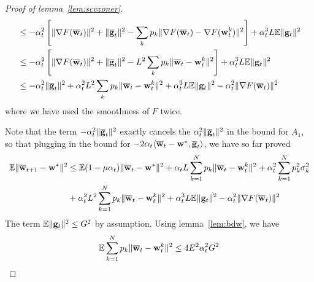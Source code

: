 \begin{proof}[Proof of lemma~\ref{lem:scvxoner}]
\begin{align*}
	& \leq-\alpha_{t}^{2}\left[\|\nabla F({\overline{\mathbf{w}}}_{t})\|^{2}+\|{\overline{\mathbf{g}}}_{t}\|^{2}-\sum_{k}p_{k}\|\nabla F({\overline{\mathbf{w}}}_{t})-\nabla F({\mathbf{w}}_{t}^{k})\|^{2}\right]+\alpha_{t}^{3}L\mathbb{E}\|{\mathbf{g}}_{t}\|^{2}\\
	& \leq-\alpha_{t}^{2}\left[\|\nabla F({\overline{\mathbf{w}}}_{t})\|^{2}+\|{\overline{\mathbf{g}}}_{t}\|^{2}-L^{2}\sum_{k}p_{k}\|{\overline{\mathbf{w}}}_{t}-{\mathbf{w}}_{t}^{k}\|^{2}\right]+\alpha_{t}^{3}L\mathbb{E}\|{\mathbf{g}}_{t}\|^{2}\\
	& \leq-\alpha_{t}^{2}\|{\overline{\mathbf{g}}}_{t}\|^{2}+\alpha_{t}^{2}L^{2}\sum_{k}p_{k}\|{\overline{\mathbf{w}}}_{t}-{\mathbf{w}}_{t}^{k}\|^{2}+\alpha_{t}^{3}L\mathbb{E}\|{\mathbf{g}}_{t}\|^{2}-\alpha_{t}^{2}\|\nabla F({\overline{\mathbf{w}}}_{t})\|^{2}
	\end{align*}
	where we have used the smoothness of $F$ twice. 
	
	Note that the term $-\alpha_{t}^{2}\|{\overline{\mathbf{g}}}_{t}\|^{2}$ exactly
	cancels the $\alpha_{t}^{2}\|{\overline{\mathbf{g}}}_{t}\|^{2}$ in the bound
	for $A_{1}$, so that plugging in the bound for $-2\alpha_{t}\langle{\overline{\mathbf{w}}}_{t}-{\mathbf{w}}^{\ast},{\overline{\mathbf{g}}}_{t}\rangle$,
	we have so far proved 
	\begin{align*}
	\mathbb{E}\|{\overline{\mathbf{w}}}_{t+1}-{\mathbf{w}}^{\ast}\|^{2} & \leq\mathbb{E}(1-\mu\alpha_{t})\|{\overline{\mathbf{w}}}_{t}-{\mathbf{w}}^{\ast}\|^{2}+\alpha_{t}L\sum_{k=1}^{N}p_{k}\|{\overline{\mathbf{w}}}_{t}-{\mathbf{w}}_{t}^{k}\|^{2}+\alpha_{t}^{2}\sum_{k=1}^{N}p_{k}^{2}\sigma_{k}^{2}\\
	& +\alpha_{t}^{2}L^{2}\sum_{k=1}^{N}p_{k}\|{\overline{\mathbf{w}}}_{t}-{\mathbf{w}}_{t}^{k}\|^{2}+\alpha_{t}^{3}L\mathbb{E}\|{\mathbf{g}}_{t}\|^{2}-\alpha_{t}^{2}\|\nabla F({\overline{\mathbf{w}}}_{t})\|^{2}
	\end{align*}
	The term $\mathbb{E}\|{\mathbf{g}}_{t}\|^{2}\leq G^{2}$ by assumption. 
	Using lemma~\ref{lem:bdw}, we have
	\begin{align*}
     \mathbb{E}\sum_{k=1}^{N}p_{k}\|{\overline{\mathbf{w}}}_{t}-{\mathbf{w}}_{t}^{k}\|^{2} \leq 4E^{2}\alpha_{t}^{2}G^{2}
	\end{align*}
	\begin{comment}
	Alternatively, we can also write
	\begin{align*}
	\sum_{k=1}^{N}p_{k}\|\ov{w}_{t}-\vw_{t}^{k}\|^{2} & =\sum_{k=1}^{N}p_{k}\|\ov{w}_{t-1}-\alpha_{t-1}\vg_{t-1}-\vw_{t-1}^{k}+\alpha_{t-1}\vg_{t-1,k}\|^{2}\\
	& \leq2\sum_{k=1}^{N}p_{k}\left(\|\ov{w}_{t-1}-\vw_{t-1}^{k}\|^{2}+\|\alpha_{t-1}\vg_{t-1}-\alpha_{t-1}\vg_{t-1,k}\|^{2}\right)
	\end{align*}
	and write 
	\begin{align*}
	\sum_{k}p_{k}\|\vg_{t-1,k}-\vg_{t-1}\|^{2}\leq\sum_{k}p_{k}\|\vg_{t-1,k}\|^{2} & =\sum_{k}p_{k}\|\vg_{t-1,k}-\nabla F_{k}(\vw_{t-1}^{k})+\nabla F_{k}(\vw_{t-1}^{k})\|^{2}\\

\end{comment}
\end{proof}
